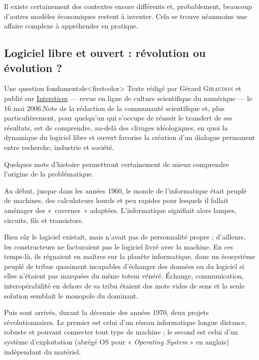 Il existe certainement des contextes encore différents et, probablement, beaucoup d'autres modèles économiques restent à inventer. Cela se trouve néanmoins une affaire complexe à appréhender en pratique.   



\subsection[Paradigme du logiciel libre]{Logiciel libre et ouvert : révolution ou évolution ?}
\label{sub:I.4.4}

Une question fondamentale\caution[t]<firstcolor>{%
Texte rédigé par Gérard \textsc{Giraudon} et publié sur \href{https://interstices.info/le-logiciel-libre-et-ouvert-revolution-ou-evolution/}{Interstices} --- revue en ligne de culture scientifique du numérique --- le 16 mai 2006.}{Note de la rédaction}
de la communauté scientifique et, plus particulièrement, pour quelqu'un qui s'occupe de réussir le transfert de ses résultats, est de comprendre, au-delà des clivages idéologiques, en quoi la dynamique du logiciel libre et ouvert favorise la création d'un dialogue permanent entre recherche, industrie et société.


Quelques mots d'histoire permettront certainement de mieux comprendre l'origine de la problématique. 

Au début, jusque dans les années 1960, le monde de l'informatique était peuplé de machines, des calculateurs lourds et peu rapides pour lesquels il fallait aménager des «~cavernes~» adaptées. L'informatique signifiait alors lampes, circuits, fils et transistors. 

Bien sûr le logiciel existait, mais n'avait pas de personnalité propre ; d'ailleurs, les constructeurs ne facturaient pas le logiciel livré avec la machine. En ces temps-là, ils régnaient en maîtres sur la planète informatique, dans un écosystème peuplé de tribus quasiment incapables d'échanger des données ou du logiciel si elles n'étaient pas marquées du même totem vénéré. Échange, communication, interopérabilité en dehors de sa tribu étaient des mots vides de sens et la seule solution semblait le monopole du dominant.

Puis sont arrivés, durant la décennie des années 1970, deux projets révolutionnaires. Le premier est celui d'un réseau informatique longue distance, robuste et pouvant connecter tout type de machine ; le second est celui d'un système d'exploitation (abrégé OS pour « \textit{Operating System} » en anglais) indépendant du matériel. 

